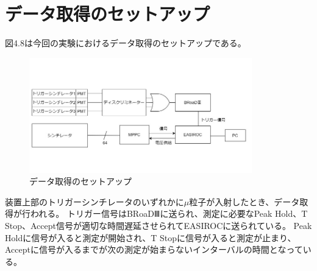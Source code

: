 \section{データ取得のセットアップ}
図4.8は今回の実験におけるデータ取得のセットアップである。
\begin{figure}[H]
    \centering
    \includegraphics[height=5cm]{img/setup.jpg}
    \caption{データ取得のセットアップ}
\end{figure}
装置上部のトリガーシンチレータのいずれかに$\mu$粒子が入射したとき、データ取得が行われる。
トリガー信号はBRoaDⅢに送られ、測定に必要なPeak Hold、T Stop、Accept信号が適切な時間遅延させられてEASIROCに送られている。
Peak Holdに信号が入ると測定が開始され、T Stopに信号が入ると測定が止まり、Acceptに信号が入るまでが次の測定が始まらないインターバルの時間となっている。

